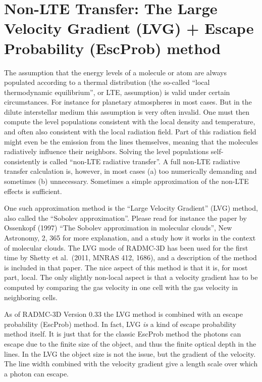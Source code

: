 \documentclass{report}
\begin{document}
\section{Non-LTE Transfer: The Large Velocity Gradient (LVG) + Escape Probability (EscProb) method}
\label{sec-lvg}
The assumption that the energy levels of a molecule or atom are always
populated according to a thermal distribution (the so-called ``local
thermodynamic equilibrium'', or LTE, assumption) is valid under certain
circumstances. For instance for planetary atmospheres in most cases.  But in
the dilute interstellar medium this assumption is very often invalid.  One
must then compute the level populations consistent with the local density
and temperature, and often also consistent with the local radiation
field. Part of this radiation field might even be the emission from the
lines themselves, meaning that the molecules radiatively influence their
neighbors. Solving the level populations self-consistently is called
``non-LTE radiative transfer''. A full non-LTE radiative transfer
calculation is, however, in most cases (a) too numerically demanding and
sometimes (b) unnecessary. Sometimes a simple approximation of the non-LTE
effects is sufficient.

One such approximation method is the ``Large Velocity Gradient'' (LVG)
method, also called the ``Sobolev approximation''.  Please read for instance
the paper by Ossenkopf (1997) ``The Sobolev approximation in molecular
clouds'', New Astronomy, 2, 365 for more explanation, and a study how it
works in the context of molecular clouds. The LVG mode of RADMC-3D has been
used for the first time by Shetty et al.~(2011, MNRAS 412, 1686), and a
description of the method is included in that paper.  The nice aspect of
this method is that it is, for most part, local. The only slightly non-local
aspect is that a velocity gradient has to be computed by comparing the gas
velocity in one cell with the gas velocity in neighboring cells.

As of RADMC-3D Version 0.33 the LVG method is combined with an escape
probability (EscProb) method. In fact, LVG {\em is} a kind of escape probability
method itself. It is just that for the classic EscProb method the photons can
escape due to the finite size of the object, and thus the finite optical
depth in the lines. In the LVG the object size is not the issue, but the
gradient of the velocity. The line width combined with the velocity gradient
give a length scale over which a photon can escape. 
\end{document}
